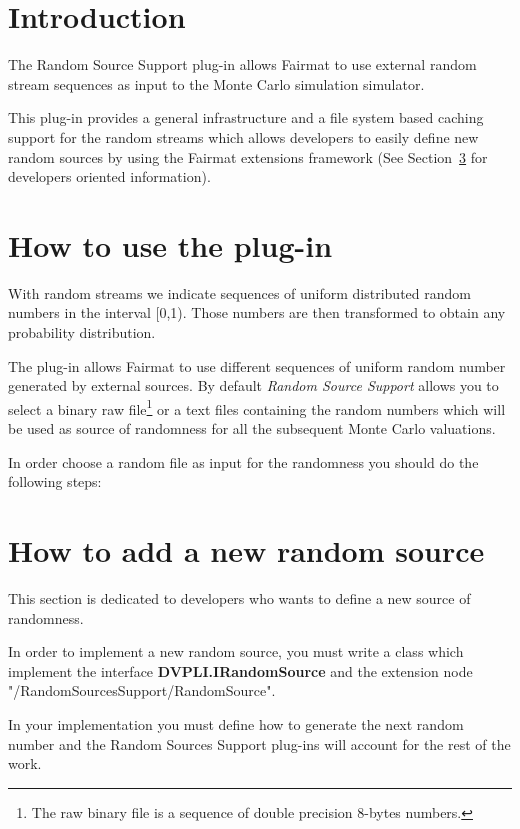 \newcommand{\pluginName}{Random Sources Support}
\newcommand{\pluginVersion}{1.0}





\PluginTitle{\pluginName}{\pluginVersion}

\section{Introduction}

The Random Source Support plug-in allows Fairmat to use external random stream sequences as input to the Monte Carlo simulation simulator.

This plug-in provides a general infrastructure and a file system based caching support for the random streams which allows developers to easily define new random sources by using the Fairmat extensions framework (See Section~\ref{sec.dev} for developers oriented information). 

\section{How to use the plug-in}

With random streams we indicate sequences of uniform distributed random numbers in the interval [0,1). Those numbers are then transformed to obtain any probability distribution.

The plug-in allows Fairmat to use different sequences of uniform random number generated by external sources. 
By default \emph{Random Source Support} allows you to select a binary raw file\footnote{The raw binary file is a sequence of double precision 8-bytes numbers.} or a text files containing the random numbers which will be used as source of randomness for all the subsequent Monte Carlo valuations.

In order choose a random file as input for the randomness you should do the following steps:

\section{How to add a new random source}
\label{sec.dev}
This section is dedicated to developers who wants  to define a new source of 
randomness.

In order to implement a new random source, you must write a
class which implement the interface \textbf{DVPLI.IRandomSource} and the extension node "/RandomSourcesSupport/RandomSource". 

In your implementation you must define how to generate the next random number and  the Random Sources Support plug-ins will account for the rest of the work.







